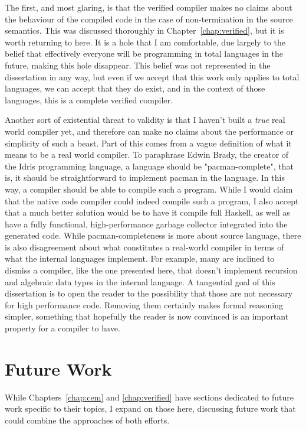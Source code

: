 The first, and most glaring, is that the verified compiler makes no claims about
the behaviour of the compiled code in the case of non-termination in the source
semantics. This was discussed thoroughly in Chapter~\ref{chap:verified}, but
it is worth returning to here. It is a hole that I am comfortable, due largely
to the belief that effectively everyone will be programming in total languages
in the future, making this hole disappear. This belief was not represented in
the dissertation in any way, but even if we accept that this work only applies
to total languages, we can accept that they do exist, and in the context of
those languages, this is a complete verified compiler. 

Another sort of existential threat to validity is that I haven't built a
\emph{true} real world compiler yet, and therefore can make no claims about the
performance or simplicity of such a beast. Part of this comes from a vague
definition of what it means to be a real world compiler. To paraphrase Edwin
Brady, the creator of the Idris programming language, a language should be
"pacman-complete", that is, it should be straightforward to implement pacman in
the language. In this way, a compiler should be able to compile such a program.
While I would claim that the native code compiler could indeed compile such a
program, I also accept that a much better solution would be to have it compile
full Haskell, as well as have a fully functional, high-performance garbage
collector integrated into the generated code. While pacman-completeness is more
about source language, there is also disagreement about what constitutes a
real-world compiler in terms of what the internal languages implement. For
example, many are inclined to dismiss a compiler, like the one presented here,
that doesn't implement recursion and algebraic data types in the internal
language. A tangential goal of this dissertation is to open the reader to the
possibility that those are not necessary for high performance code. Removing
them certainly makes formal reasoning simpler, something that hopefully the
reader is now convinced is an important property for a compiler to have.  

\section{Future Work}

While Chapters~\ref{chap:cem} and \ref{chap:verified} have sections dedicated to
future work specific to their topics, I expand on those here, discussing future
work that could combine the approaches of both efforts. 

